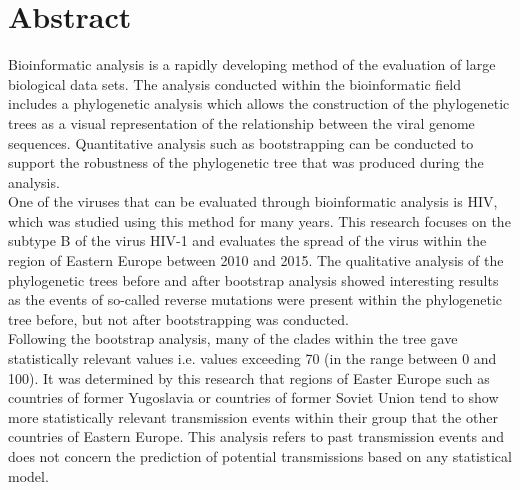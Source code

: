 \chapter{Abstract}

Bioinformatic analysis is a rapidly developing method of the evaluation of large biological data sets.
The analysis conducted within the bioinformatic field includes a phylogenetic analysis which allows the construction of the phylogenetic trees as a visual representation of the relationship between the viral genome sequences. 
Quantitative analysis such as bootstrapping can be conducted to support the robustness of the phylogenetic tree that was produced during the analysis. \\
One of the viruses that can be evaluated through bioinformatic analysis is HIV, which was studied using this method for many years. 
This research focuses on the subtype B of the virus HIV-1 and evaluates the spread of the virus within the region of Eastern Europe between 2010 and 2015. 
The qualitative analysis of the phylogenetic trees before and after bootstrap analysis showed interesting results as the events of so-called reverse mutations were present within the phylogenetic tree before, but not after bootstrapping was conducted. \\
Following the bootstrap analysis, many of the clades within the tree  gave statistically relevant values i.e. values exceeding 70 (in the range between 0 and 100).  
It was determined by this research that regions of Easter Europe such as countries of former Yugoslavia or countries of former Soviet Union tend to show more statistically relevant transmission events within their group that the other countries of Eastern Europe. 
This analysis refers to past transmission events and does not concern the prediction of potential transmissions based on any statistical model.
